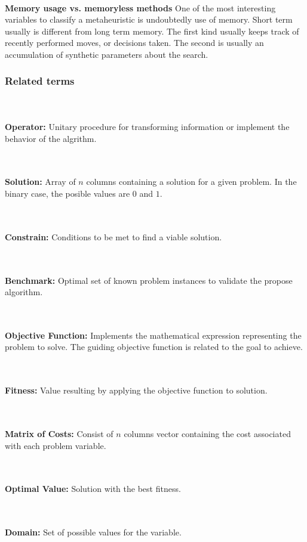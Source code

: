 ~\\
\textbf{Memory usage vs. memoryless methods}
One of the most interesting variables to classify a metaheuristic is undoubtedly use of memory. Short term usually is different from long term memory. The first kind usually keeps track of recently performed moves, or decisions taken. The second is usually an accumulation of synthetic parameters about the search. 

\subsubsection{Related terms}
~\\~\\
\textbf{Operator:} 
Unitary procedure for transforming information or implement the behavior of the algrithm.

~\\~\\
\textbf{Solution:} 
Array of $n$ columns containing a solution for a given problem. In the binary case, the posible values are $0$ and $1$.

~\\~\\
\textbf{Constrain:} 
Conditions to be met to find a viable solution.

~\\~\\
\textbf{Benchmark:} 
Optimal set of known problem instances to validate the propose algorithm.

~\\~\\
\textbf{Objective Function:}  
Implements the mathematical expression representing the problem to solve. The guiding objective function is related to the goal to achieve.

~\\~\\
\textbf{Fitness:} 
Value resulting by applying the objective function to solution.

~\\~\\
\textbf{Matrix of Costs:} 
Consist of $n$ columns vector containing the cost associated with each problem variable.

~\\~\\
\textbf{Optimal Value:} 
Solution with the best fitness.

~\\~\\
\textbf{Domain:} 
Set of possible values for the variable.

